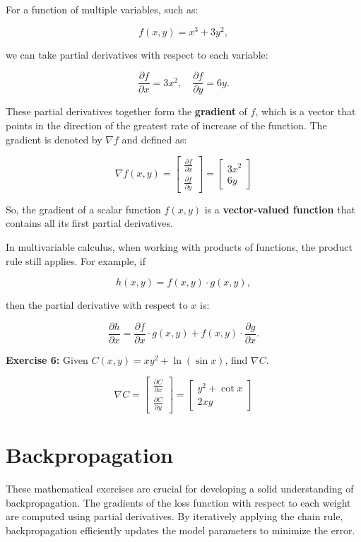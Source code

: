 For a function of multiple variables, such as:

\[
f(x, y) = x^3 + 3y^2,
\]

we can take partial derivatives with respect to each variable:

\[
\frac{\partial f}{\partial x} = 3x^2, \quad \frac{\partial f}{\partial y} = 6y.
\]

These partial derivatives together form the \textbf{gradient} of \(f\), which is a vector that points in the direction of the greatest rate of increase of the function. The gradient is denoted by \(\nabla f\) and defined as:

\[
\nabla f(x, y) =
\begin{bmatrix}
    \frac{\partial f}{\partial x} \\
    \frac{\partial f}{\partial y}
\end{bmatrix}
=
\begin{bmatrix}
    3x^2 \\
    6y
\end{bmatrix}
\]

So, the gradient of a scalar function \(f(x, y)\) is a \textbf{vector-valued function} that contains all its first partial derivatives.

\bigskip

In multivariable calculus, when working with products of functions, the product rule still applies. For example, if

\[
h(x, y) = f(x, y) \cdot g(x, y),
\]

then the partial derivative with respect to \(x\) is:

\[
\frac{\partial h}{\partial x} = \frac{\partial f}{\partial x} \cdot g(x, y) + f(x, y) \cdot \frac{\partial g}{\partial x}.
\]

\textbf{Exercise 6:} Given $C(x, y) = xy^2 + \ln (\sin x)$, find $\nabla C$.

\[
\nabla C = 
\begin{bmatrix}
    \frac{\partial C}{\partial x} \\
    \frac{\partial C}{\partial y}
\end{bmatrix}
=
\begin{bmatrix}
    y^2 + \cot x \\
    2xy
\end{bmatrix}
\]

\section{Backpropagation}

These mathematical exercises are crucial for developing a solid understanding of backpropagation. 
The gradients of the loss function with respect to each weight are computed using partial derivatives. 
By iteratively applying the chain rule, backpropagation efficiently updates the model parameters to minimize the error.

